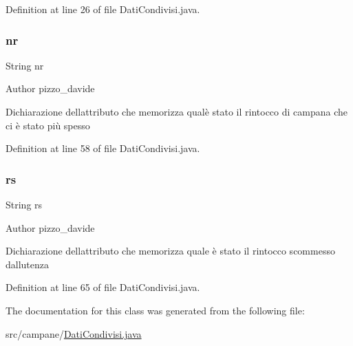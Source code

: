 Definition at line 26 of file Dati\+Condivisi.\+java.

\mbox{\label{classcampane_1_1_dati_condivisi_ae008b53823e232ad42a78357f1f8069e}} 
\subsubsection{\texorpdfstring{nr}{nr}}
{\footnotesize\ttfamily String nr\hspace{0.3cm}{\ttfamily [private]}}

\begin{DoxyAuthor}{Author}
pizzo\+\_\+davide
\end{DoxyAuthor}
Dichiarazione dell\textquotesingle{}attributo che memorizza qual\textquotesingle{}è stato il rintocco di campana che ci è stato più spesso 

Definition at line 58 of file Dati\+Condivisi.\+java.

\mbox{\label{classcampane_1_1_dati_condivisi_a2a2ac2d508a6792e74d24e27bd656ef9}} 
\subsubsection{\texorpdfstring{rs}{rs}}
{\footnotesize\ttfamily String rs\hspace{0.3cm}{\ttfamily [private]}}

\begin{DoxyAuthor}{Author}
pizzo\+\_\+davide
\end{DoxyAuthor}
Dichiarazione dell\textquotesingle{}attributo che memorizza quale è stato il rintocco scommesso dall\textquotesingle{}utenza 

Definition at line 65 of file Dati\+Condivisi.\+java.



The documentation for this class was generated from the following file\+:\begin{DoxyCompactItemize}
\item 
src/campane/\hyperlink{_dati_condivisi_8java}{Dati\+Condivisi.\+java}\end{DoxyCompactItemize}
